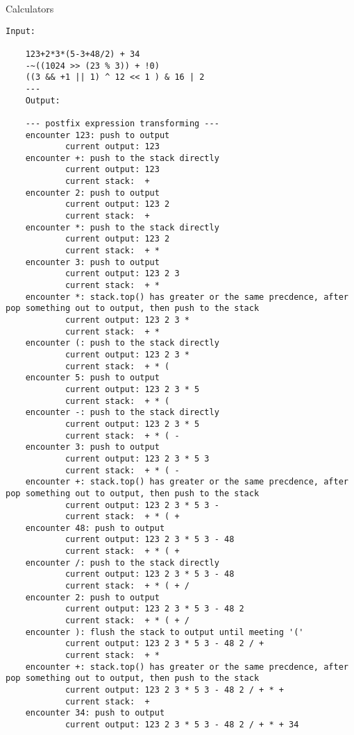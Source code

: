 \begin{homeworkProblem}{Calculators}

    \begin{lstlisting}[breaklines=true]
    Input:

    123+2*3*(5-3+48/2) + 34
    -~((1024 >> (23 % 3)) + !0)
    ((3 && +1 || 1) ^ 12 << 1 ) & 16 | 2
    ---
    Output:

    --- postfix expression transforming ---
    encounter 123: push to output
            current output: 123
    encounter +: push to the stack directly
            current output: 123
            current stack:  +
    encounter 2: push to output
            current output: 123 2
            current stack:  +
    encounter *: push to the stack directly
            current output: 123 2
            current stack:  + *
    encounter 3: push to output
            current output: 123 2 3
            current stack:  + *
    encounter *: stack.top() has greater or the same precdence, after pop something out to output, then push to the stack
            current output: 123 2 3 *
            current stack:  + *
    encounter (: push to the stack directly
            current output: 123 2 3 *
            current stack:  + * (
    encounter 5: push to output
            current output: 123 2 3 * 5
            current stack:  + * (
    encounter -: push to the stack directly
            current output: 123 2 3 * 5
            current stack:  + * ( -
    encounter 3: push to output
            current output: 123 2 3 * 5 3
            current stack:  + * ( -
    encounter +: stack.top() has greater or the same precdence, after pop something out to output, then push to the stack
            current output: 123 2 3 * 5 3 -
            current stack:  + * ( +
    encounter 48: push to output
            current output: 123 2 3 * 5 3 - 48
            current stack:  + * ( +
    encounter /: push to the stack directly
            current output: 123 2 3 * 5 3 - 48
            current stack:  + * ( + /
    encounter 2: push to output
            current output: 123 2 3 * 5 3 - 48 2
            current stack:  + * ( + /
    encounter ): flush the stack to output until meeting '('
            current output: 123 2 3 * 5 3 - 48 2 / +
            current stack:  + *
    encounter +: stack.top() has greater or the same precdence, after pop something out to output, then push to the stack
            current output: 123 2 3 * 5 3 - 48 2 / + * +
            current stack:  +
    encounter 34: push to output
            current output: 123 2 3 * 5 3 - 48 2 / + * + 34

\end{lstlisting}
\end{homeworkProblem}

